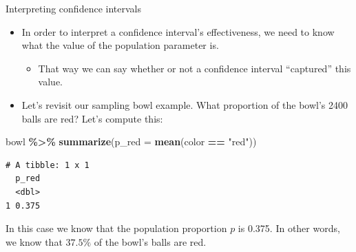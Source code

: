 \documentclass[
  ignorenonframetext,
]{beamer}
\newenvironment{Shaded}{\begin{snugshade}}{\end{snugshade}}
\newcommand{\AttributeTok}[1]{\textcolor[rgb]{0.13,0.29,0.53}{#1}}
\newcommand{\FunctionTok}[1]{\textcolor[rgb]{0.13,0.29,0.53}{\textbf{#1}}}
\newcommand{\NormalTok}[1]{#1}
\newcommand{\SpecialCharTok}[1]{\textcolor[rgb]{0.81,0.36,0.00}{\textbf{#1}}}
\newcommand{\StringTok}[1]{\textcolor[rgb]{0.31,0.60,0.02}{#1}}
\providecommand{\tightlist}{%
  \setlength{\itemsep}{0pt}\setlength{\parskip}{0pt}}
\begin{document}
\begin{frame}[fragile]{Interpreting confidence intervals}
\protect\hypertarget{interpreting-confidence-intervals-2}{}
\begin{itemize}
\item
  In order to interpret a confidence interval's effectiveness, we need
  to know what the value of the population parameter is.

  \begin{itemize}
  \tightlist
  \item
    That way we can say whether or not a confidence interval
    ``captured'' this value.
  \end{itemize}
\item
  Let's revisit our sampling bowl example. What proportion of the bowl's
  2400 balls are red? Let's compute this:
\end{itemize}

\begin{Shaded}
\begin{Highlighting}[]
\NormalTok{bowl }\SpecialCharTok{\%\textgreater{}\%} \FunctionTok{summarize}\NormalTok{(}\AttributeTok{p\_red =} \FunctionTok{mean}\NormalTok{(color }\SpecialCharTok{==} \StringTok{"red"}\NormalTok{))}
\end{Highlighting}
\end{Shaded}

\begin{verbatim}
# A tibble: 1 x 1
  p_red
  <dbl>
1 0.375
\end{verbatim}

In this case we know that the population proportion \(p\) is 0.375. In
other words, we know that \(37.5\%\) of the bowl's balls are red.
\end{frame}
\end{document}
